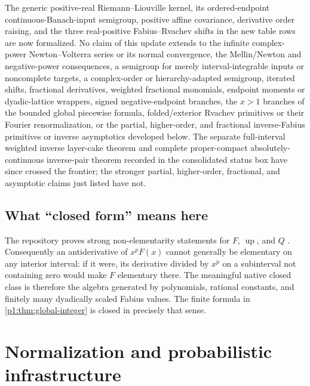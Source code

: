 \documentclass[11pt,oneside]{article}
\theoremstyle{definition}
\theoremstyle{remark}
\newcommand{\Up}{\operatorname{up}}
\newcommand{\1}{\mathbf 1}
\begin{document}
The generic positive-real Riemann--Liouville kernel, its ordered-endpoint
continuous-Banach-input semigroup, positive affine covariance, derivative order raising, and
the three real-positive Fabius--Rvachev shifts in the new table rows are now formalized.  No
claim of this update extends to the infinite complex-power
Newton--Volterra series or its normal convergence, the Mellin/Newton and
negative-power consequences, a semigroup for merely interval-integrable inputs or
noncomplete targets, a complex-order or hierarchy-adapted semigroup, iterated shifts,
fractional derivatives, weighted fractional monomials, endpoint moments or dyadic-lattice
wrappers, signed negative-endpoint branches, the \(x>1\) branches of the bounded global
piecewise formula, folded/exterior Rvachev primitives or their Fourier renormalization, or the
partial, higher-order, and fractional inverse-Fabius primitives or inverse asymptotics developed below.
The separate full-interval weighted inverse layer-cake theorem and complete
proper-compact absolutely-continuous inverse-pair theorem recorded in the consolidated
status box have since crossed the frontier; the stronger partial, higher-order,
fractional, and asymptotic claims just listed have not.

\subsection{What ``closed form'' means here}
The repository proves strong non-elementarity statements for \(F\), \(\Up\),
and \(Q\) \cite{p1:ProveItNonElementary,p1:ProveItFrontiers}.  Consequently an
antiderivative of \(x^pF(x)\) cannot generally be elementary on any interior
interval: if it were, its derivative divided by \(x^p\) on a subinterval not
containing zero would make \(F\) elementary there.  The meaningful native
closed class is therefore the algebra generated by polynomials, rational
constants, and finitely many dyadically scaled Fabius values.  The finite
formula in \cref{p1:thm:global-integer} is closed in precisely that sense.

\section{Normalization and probabilistic infrastructure}
\end{document}
